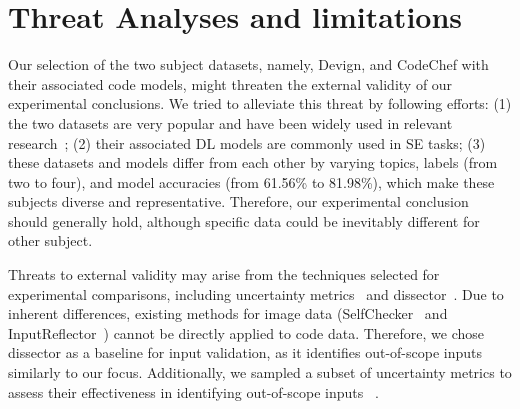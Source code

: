 \section{Threat Analyses and limitations}
\label{threat}

Our selection of the two subject datasets, namely, Devign, and CodeChef with their associated code models, might threaten the external validity of our experimental conclusions. We tried to alleviate this threat by following efforts: 
(1) the two datasets are very popular and have been widely used in relevant research~\cite{lu2021codexglue,tian2023code,yang2022natural,carrot}; (2) their associated DL models are commonly used in SE tasks; (3) these datasets and models differ from each other by varying topics, %
labels (from two to four), and model accuracies (from 61.56\% to 81.98\%), which make these subjects diverse and representative. Therefore, our experimental conclusion should generally hold, although specific data could be inevitably different for other subject. 


Threats to external validity may arise from the techniques selected for experimental comparisons, including uncertainty metrics\textcolor{blue}{~\cite{guo2017calibration,wang2020dissector,hendrycks2018baseline,gal2016dropout, alon2019code2vec,xiao2019quantifying,vasudevan2019towards,corbiere2019addressing, monarch2021human, steinhardt2016unsupervised,shannon1948mathematical}} and dissector~\cite{wang2020dissector}. Due to inherent differences, existing methods for image data (SelfChecker~\cite{xiao2021selfchecking} and InputReflector~\cite{xiao2022repairing}) cannot be directly applied to code data. Therefore, we chose dissector as a baseline for input validation, as it identifies out-of-scope inputs similarly to our focus. Additionally, we sampled a subset of uncertainty metrics to assess their effectiveness in identifying out-of-scope inputs \textcolor{blue}{~\cite{guo2017calibration,wang2020dissector,hendrycks2018baseline,gal2016dropout, alon2019code2vec,xiao2019quantifying,vasudevan2019towards,corbiere2019addressing, monarch2021human, steinhardt2016unsupervised,shannon1948mathematical}}.


